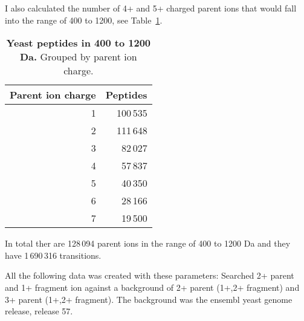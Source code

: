\begin{table}[h]
\begin{comment}
drop table non_unique_yeast_proteins;
create temporary table non_unique_yeast_proteins as
select distinct protein_key from ddb.peptide 
inner join ddb.protPepLink on protPepLink.peptide_key = peptide.id
where experiment_key = 3120 
and protein_key not in (select * from unique_yeast_proteins)
;

#see how many peptides each of the non unique proteins has
select protPepLink.protein_key, count(*) from
non_unique_yeast_proteins 
inner join ddb.protPepLink on protPepLink.protein_key = non_unique_yeast_proteins.protein_key
group by protPepLink.protein_key;

\end{comment}

\end{table}

I also calculated the number of 4+ and 5+ charged parent ions that would fall
into the range of 400 to 1200, see Table~\ref{tab:yeast_pepprot_ions}.

\begin{table}[h]

\centering
\caption[Yeast peptides in 400 to 1200 Da.]
{\textbf{Yeast peptides in 400 to 1200 Da.} Grouped by parent ion charge.  }
\label{tab:yeast_pepprot_ions}

\begin{tabular}{ r r }
\maketablespace
Parent ion charge & Peptides   \\
\toprule
1 & 100\,535  \\
2 & 111\,648  \\
3 &  82\,027  \\
4 &  57\,837  \\
5 &  40\,350  \\
6 &  28\,166  \\
7 &  19\,500  \\

\end{tabular}

\end{table}

In total ther are 128\,094 parent ions in the range of 400 to 1200 Da and they
have  1\,690\,316 transitions.

All the following data was created with these parameters: 
Searched 2+ parent and 1+ fragment ion against a background of 2+ parent (1+,2+
fragment) and 3+ parent (1+,2+ fragment). The background was the ensembl yeast
genome release, release 57.

